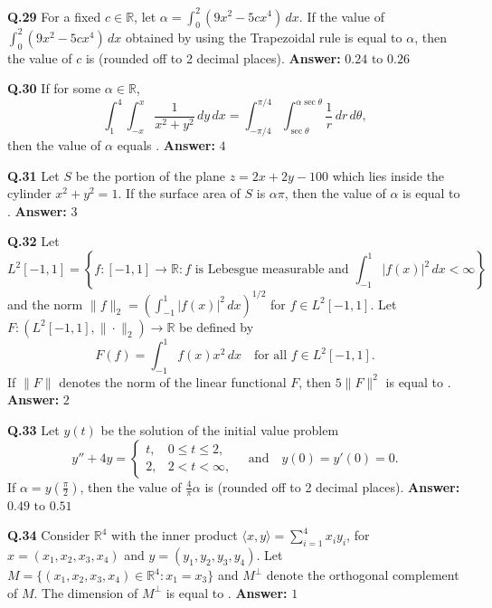 \documentclass[11pt,a4paper]{article}
\newcommand{\ans}[1]{\textbf{Answer:} #1\par\medskip}
\begin{document}
\textbf{Q.29} For a fixed $c \in \mathbb{R}$, let $\alpha = \int_0^2 (9x^2 - 5cx^4)\,dx$. If the value of $\int_0^2 (9x^2 - 5cx^4)\,dx$ obtained by using the Trapezoidal rule is equal to $\alpha$, then the value of $c$ is \underline{\hspace{2cm}} (rounded off to 2 decimal places).
\ans{$0.24 \text{ to } 0.26$}

\textbf{Q.30} If for some $\alpha \in \mathbb{R}$,
\[
  \int_1^4 \int_{-x}^{x} \frac{1}{x^2 + y^2}\,dy\,dx = \int_{-\pi/4}^{\pi/4} \int_{\sec\theta}^{\alpha\sec\theta} \frac{1}{r}\,dr\,d\theta,
\]
then the value of $\alpha$ equals \underline{\hspace{2cm}}.
\ans{$4$}

\textbf{Q.31} Let $S$ be the portion of the plane $z = 2x + 2y - 100$ which lies inside the cylinder $x^2 + y^2 = 1$. If the surface area of $S$ is $\alpha\pi$, then the value of $\alpha$ is equal to \underline{\hspace{2cm}}.
\ans{$3$}

\textbf{Q.32} Let
\[
  L^2[-1, 1] = \left\{f : [-1, 1] \to \mathbb{R} : f \text{ is Lebesgue measurable and } \int_{-1}^{1} |f(x)|^2\,dx < \infty\right\}
\]
and the norm $\|f\|_2 = \left(\int_{-1}^{1} |f(x)|^2\,dx\right)^{1/2}$ for $f \in L^2[-1, 1]$. Let $F : (L^2[-1, 1], \|\cdot\|_2) \to \mathbb{R}$ be defined by
\[
  F(f) = \int_{-1}^{1} f(x) x^2\,dx \quad \text{for all } f \in L^2[-1, 1].
\]
If $\|F\|$ denotes the norm of the linear functional $F$, then $5\|F\|^2$ is equal to \underline{\hspace{2cm}}.
\ans{$2$}

\textbf{Q.33} Let $y(t)$ be the solution of the initial value problem
\[
  y'' + 4y = \begin{cases} t, & 0 \le t \le 2, \\ 2, & 2 < t < \infty, \end{cases} \quad \text{and} \quad y(0) = y'(0) = 0.
\]
If $\alpha = y\!\left(\frac{\pi}{2}\right)$, then the value of $\frac{4}{\pi}\alpha$ is \underline{\hspace{2cm}} (rounded off to 2 decimal places).
\ans{$0.49 \text{ to } 0.51$}

\textbf{Q.34} Consider $\mathbb{R}^4$ with the inner product $\langle x, y \rangle = \sum_{i=1}^4 x_i y_i$, for $x = (x_1, x_2, x_3, x_4)$ and $y = (y_1, y_2, y_3, y_4)$. Let $M = \{(x_1, x_2, x_3, x_4) \in \mathbb{R}^4 : x_1 = x_3\}$ and $M^\perp$ denote the orthogonal complement of $M$. The dimension of $M^\perp$ is equal to \underline{\hspace{2cm}}.
\ans{$1$}
\end{document}
